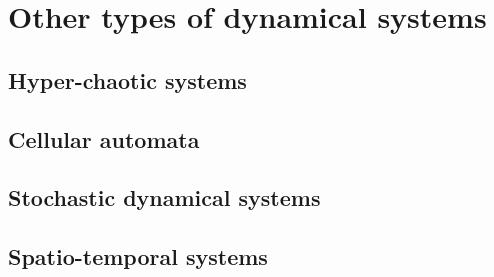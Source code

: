 \chapter{Other types of dynamical systems}

\section{Hyper-chaotic systems}

\section{Cellular automata}

\section{Stochastic dynamical systems}

\section{Spatio-temporal systems}
